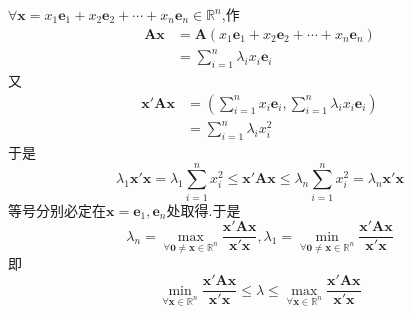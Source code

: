     $\forall\bm{x}=x_1\bm{e}_1+x_2\bm{e}_2+\cdots+x_n\bm{e}_n\in\mathbb{R}^n$,作\begin{align*}
        \bm{Ax}&=\bm{A}\left(
            x_1\bm{e}_1+x_2\bm{e}_2+\cdots+x_n\bm{e}_n
        \right)\\
        &=\sum_{i=1}^{n}\lambda_ix_i\bm{e}_i
    \end{align*}又\begin{align*}
        \bm{x}'\bm{Ax}&=\left(
            \sum_{i=1}^{n}x_i\bm{e}_i,\sum_{i=1}^{n}\lambda_ix_i\bm{e}_i
        \right)\\
        &=\sum_{i=1}^{n}\lambda_ix_i^2
    \end{align*}于是\[
    \lambda_1\bm{x}'\bm{x}=\lambda_1\sum_{i=1}^{n}x_i^2\leqslant\bm{x}'\bm{Ax}\leqslant\lambda_n\sum_{i=1}^{n}x_i^2=\lambda_n\bm{x}'\bm{x}
    \]等号分别必定在$\bm{x}=\bm{e}_1,\bm{e}_n$处取得.于是\[
    \lambda_n=\max_{\forall\bm{0}\neq\bm{x}\in\mathbb{R}^n}\frac{\bm{x}'\bm{Ax}}{\bm{x}'\bm{x}},\lambda_1=\min_{\forall\bm{0}\neq\bm{x}\in\mathbb{R}^n}\frac{\bm{x}'\bm{Ax}}{\bm{x}'\bm{x}}
    \]即\[
    \min_{\forall\bm{x}\in\mathbb{R}^n}\frac{\bm{x}'\bm{Ax}}{\bm{x}'\bm{x}}\leqslant\lambda\leqslant\max_{\forall\bm{x}\in\mathbb{R}^n}\frac{\bm{x}'\bm{Ax}}{\bm{x}'\bm{x}}
    \]
